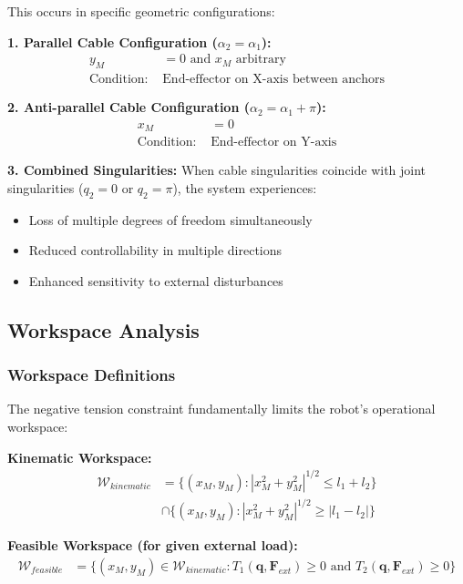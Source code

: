 This occurs in specific geometric configurations:

\textbf{1. Parallel Cable Configuration ($\alpha_2 = \alpha_1$):}
\begin{align}
y_M &= 0 \text{ and } x_M \text{ arbitrary} \\
\text{Condition: } &\text{End-effector on X-axis between anchors}
\end{align}

\textbf{2. Anti-parallel Cable Configuration ($\alpha_2 = \alpha_1 + \pi$):}
\begin{align}
x_M &= 0 \\
\text{Condition: } &\text{End-effector on Y-axis}
\end{align}

\textbf{3. Combined Singularities:}
When cable singularities coincide with joint singularities ($q_2 = 0$ or $q_2 = \pi$), the system experiences:
\begin{itemize}
    \item Loss of multiple degrees of freedom simultaneously
    \item Reduced controllability in multiple directions
    \item Enhanced sensitivity to external disturbances
\end{itemize}

\subsection{Workspace Analysis}

\subsubsection{Workspace Definitions}
The negative tension constraint fundamentally limits the robot's operational workspace:

\textbf{Kinematic Workspace:}
\begin{align}
\mathcal{W}_{kinematic} &= \{(x_M, y_M) : |x_M^2 + y_M^2|^{1/2} \leq l_1 + l_2\} \\
&\cap \{(x_M, y_M) : |x_M^2 + y_M^2|^{1/2} \geq |l_1 - l_2|\}
\end{align}

\textbf{Feasible Workspace (for given external load):}
\begin{align}
\mathcal{W}_{feasible} &= \{(x_M, y_M) \in \mathcal{W}_{kinematic} : T_1(\bm{q}, \bm{F}_{ext}) \geq 0 \text{ and } T_2(\bm{q}, \bm{F}_{ext}) \geq 0\}
\end{align}

